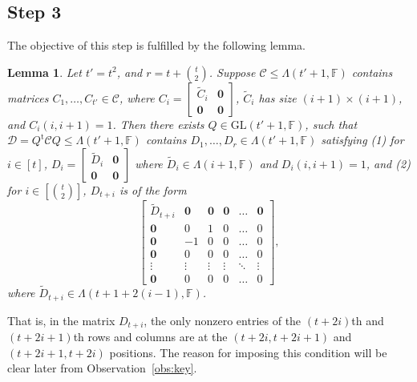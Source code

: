 \documentclass[10pt]{article}
\newtheorem{lemma}[theorem]{Lemma}
\newcommand{\tuple}[1]{\mathbf{#1}}
\newcommand{\spa}[1]{\mathcal{#1}}
\newcommand{\GL}{\mathrm{GL}}
\newcommand{\F}{\mathbb{F}}
\newcommand{\cC}{\spa{C}}
\newcommand{\cD}{\spa{D}}
\newcommand{\vzero}{\tuple{0}}
\newcommand{\tr}[1]{#1^{\mathrm{t}}}
\begin{document}
\subsection{Step 3} The objective of this step is fulfilled by the following 
lemma. 
\begin{lemma}\label{lem:step3}
Let $t'=t^2$, and $r=t+\binom{t}{2}$. 
Suppose $\cC\leq 
\Lambda(t'+1, \F)$ contains matrices $C_1, \dots, C_{t'}\in \cC$, where
$C_i=\begin{bmatrix}
\tilde C_i & \vzero \\
\vzero & \vzero 
\end{bmatrix}$, $\tilde C_i$ has size $(i+1)\times (i+1)$, and $C_i(i, 
i+1)=1$.
Then there exists $Q\in\GL(t'+1, \F)$, such that $\cD=\tr{Q}\cC Q\leq 
\Lambda(t'+1, 
\F)$ contains 
$D_1, 
\dots, D_r\in \Lambda(t'+1, \F)$ satisfying (1) for $i\in [t]$, 
$D_i=\begin{bmatrix}
\tilde D_i & \vzero \\
\vzero & \vzero 
\end{bmatrix}$ where $\tilde D_i\in \Lambda(i+1, \F)$ and $D_i(i, i+1)=1$, 
and 
(2) for 
$i\in[\binom{t}{2}]$, $D_{t+i}$ is of the form
%
%
%
%
%
%
\begin{equation}\label{eq:form_of_D}
\begin{bmatrix}
\tilde D_{t+i} & \vzero & \vzero & \vzero & \dots & \vzero \\
\vzero & 0 & 1 & 0 & \dots & 0 \\
\vzero & -1 & 0 & 0 & \dots & 0 \\
\vzero & 0 & 0 & 0 & \dots & 0 \\
\vdots & \vdots & \vdots & \vdots & \ddots & \vdots \\
\vzero & 0 & 0 & 0 & \dots & 0 
\end{bmatrix}, 
\end{equation}
where $\tilde D_{t+i}\in\Lambda(t+1+2(i-1), \F)$. 
\end{lemma}

That is, in the matrix $D_{t+i}$, the only nonzero 
entries 
of the $(t+2i)$th and $(t+2i+1)$th rows and columns are at the $(t+2i, t+2i+1)$ 
and $(t+2i+1, t+2i)$ positions. The reason for imposing this condition will be 
clear later from Observation~\ref{obs:key}.
\end{document}

